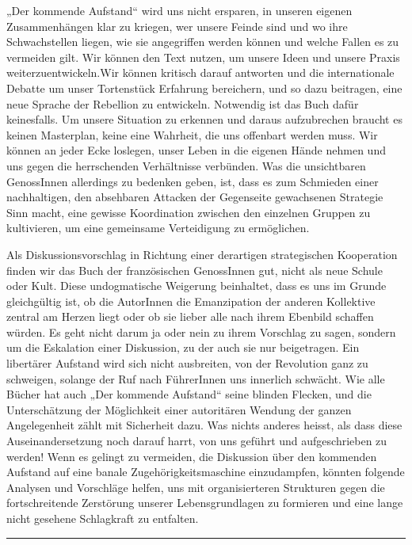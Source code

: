 „Der kommende Aufstand“ wird uns nicht ersparen, in unseren eigenen
Zusammenhängen klar zu kriegen, wer unsere Feinde sind und wo ihre
Schwachstellen liegen, wie sie angegriffen werden können und welche
Fallen es zu vermeiden gilt. Wir können den Text nutzen, um unsere
Ideen und unsere Praxis weiterzuentwickeln.Wir können kritisch
darauf antworten und die internationale Debatte um unser
Tortenstück Erfahrung bereichern, und so dazu beitragen, eine neue
Sprache der Rebellion zu entwickeln. Notwendig ist das Buch dafür
keinesfalls. Um unsere Situation zu erkennen und daraus
aufzubrechen braucht es keinen Masterplan, keine eine Wahrheit, die
uns offenbart werden muss. Wir können an jeder Ecke loslegen, unser
Leben in die eigenen Hände nehmen und uns gegen die herrschenden
Verhältnisse verbünden. Was die unsichtbaren GenossInnen allerdings
zu bedenken geben, ist, dass es zum Schmieden einer nachhaltigen,
den absehbaren Attacken der Gegenseite gewachsenen Strategie Sinn
macht, eine gewisse Koordination zwischen den einzelnen Gruppen zu
kultivieren, um eine gemeinsame Verteidigung zu ermöglichen.
\extrapar{}

Als Diskussionsvorschlag in Richtung einer derartigen strategischen
Kooperation finden wir das Buch der französischen GenossInnen gut,
nicht als neue Schule oder Kult. Diese undogmatische Weigerung
beinhaltet, dass es uns im Grunde gleichgültig ist, ob die
AutorInnen die Emanzipation der anderen Kollektive zentral am
Herzen liegt oder ob sie lieber alle nach ihrem Ebenbild schaffen
würden. Es geht nicht darum ja oder nein zu ihrem Vorschlag zu
sagen, sondern um die Eskalation einer Diskussion, zu der auch sie
nur beigetragen. Ein libertärer Aufstand wird sich nicht
ausbreiten, von der Revolution ganz zu schweigen, solange der Ruf
nach FührerInnen uns innerlich schwächt. Wie alle Bücher hat auch
„Der kommende Aufstand“ seine blinden Flecken, und die
Unterschätzung der Möglichkeit einer autoritären Wendung der ganzen
Angelegenheit zählt mit Sicherheit dazu. Was nichts anderes heisst,
als dass diese Auseinandersetzung noch darauf harrt, von uns
geführt und aufgeschrieben zu werden! Wenn es gelingt zu vermeiden,
die Diskussion über den kommenden Aufstand auf eine banale
Zugehörigkeitsmaschine einzudampfen, könnten folgende Analysen und
Vorschläge helfen, uns mit organisierteren Strukturen gegen die
fortschreitende Zerstörung unserer Lebensgrundlagen zu formieren
und eine lange nicht gesehene Schlagkraft zu entfalten.

\begin{center}\rule{3in}{0.4pt}\end{center}
\newpage
\tableofcontents

